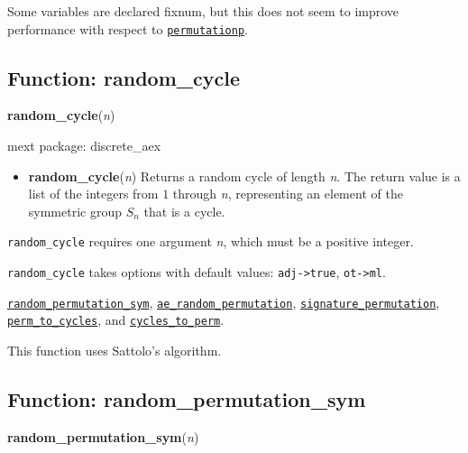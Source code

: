 \documentclass[]{article}
\begin{document}
\vspace{5 pt}


Some variables are declared fixnum, but this does not seem to improve performance with respect to \hyperlink{permutationp}{{\tt permutationp}}. 

\vspace{5 pt}


\subsection{Function: random\_cycle\label{sec:random_cycle}}
\hypertarget{random_cycle}{}
{\bf random\_cycle}({\it n})


\noindent mext package: discrete\_aex



\vspace{5 pt}
\begin{itemize}
\item[] {\bf random\_cycle}({\it n})
  Returns a random cycle of length {\it n}. The return value is a list of the integers from $1$ through {\it n}, representing an element of the symmetric group $S_n$ that is a cycle. 

\end{itemize}
   {\tt random\_cycle} requires one argument {\it n}, which must be a positive integer.


\vspace{5 pt}

{\tt random\_cycle} takes options with default values: {\tt adj->true}, {\tt ot->ml}.
\vspace{5 pt}


  \hyperlink{random_permutation_sym}{{\tt random\_permutation\_sym}}, \hyperlink{ae_random_permutation}{{\tt ae\_random\_permutation}}, \hyperlink{signature_permutation}{{\tt signature\_permutation}}, \hyperlink{perm_to_cycles}{{\tt perm\_to\_cycles}}, and \hyperlink{cycles_to_perm}{{\tt cycles\_to\_perm}}.

\vspace{5 pt}


This function uses Sattolo's algorithm. 

\vspace{5 pt}


\subsection{Function: random\_permutation\_sym\label{sec:random_permutation_sym}}
\hypertarget{random_permutation_sym}{}
{\bf random\_permutation\_sym}({\it n})
\end{document}
